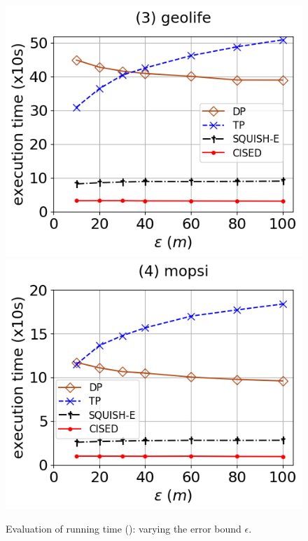 \begin{figure}[tb!]
	\includegraphics[scale=0.315]{Figures/Exp-SED-time-epsilon-geolife.png}	\hspace{1ex}
	\includegraphics[scale=0.315]{Figures/Exp-SED-time-epsilon-mopsi.png}	\hspace{1ex}
	\vspace{-3ex}
	\caption{\small Evaluation of running time (\sed): varying the error bound $\epsilon$.}\label{fig:time-epsilon-sed}
	\vspace{-2ex}
\end{figure}

